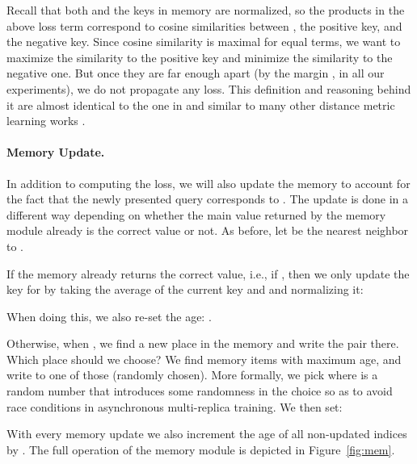 \documentclass{article} \usepackage{iclr2017_conference,times}
\begin{document}
Recall that both  and the keys in memory are normalized,
so the products in the above loss term correspond to cosine similarities
between , the positive key, and the negative key. Since cosine similarity
is maximal for equal terms, we want to maximize the similarity to the positive key
and minimize the similarity to the negative one. But once they are far enough apart
(by the margin ,  in all our experiments), we
do not propagate any loss. This definition and reasoning behind it are almost
identical to the one in \cite{facenet} and similar to many other distance
metric learning works \citep{weinberger, wsabie}.

\paragraph{Memory Update.}
In addition to computing the loss, we will also update the memory 
to account for the fact that the newly presented query  corresponds to .
The update is done in a different way depending on whether the main value
returned by the memory module already is the correct value  or not.
As before, let  be the nearest neighbor to .

If the memory already returns the correct value, i.e., if ,
then we only update the key for  by taking the average of
the current key and  and normalizing it:

When doing this, we also re-set the age: .

Otherwise, when , we find a new place in the memory
and write the pair  there. Which place should we choose? We find
memory items with maximum age, and write to one of those (randomly chosen).
More formally, we pick  where  is
a random number that introduces some randomness in the choice so as to
avoid race conditions in asynchronous multi-replica training.  We then set:

With every memory update we also increment the age of all non-updated indices by .
The full operation of the memory module is depicted in Figure~\ref{fig:mem}.
\end{document}
